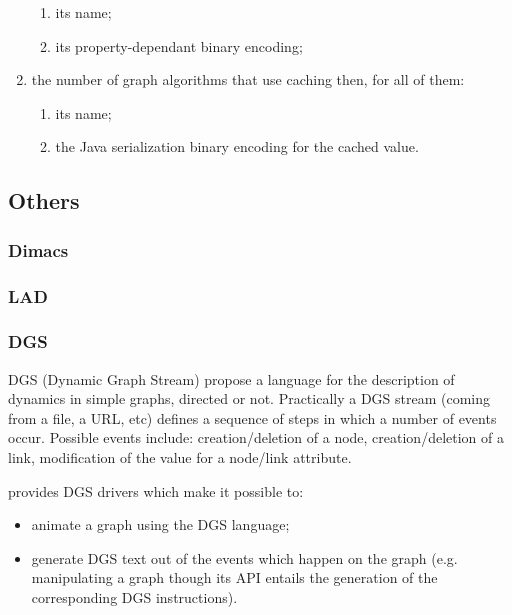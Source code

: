 \documentclass{article}
\begin{document}
\begin{enumerate}
  	  	\begin{enumerate}
	  	\item its name;
	  	\item its property-dependant binary encoding;
		\end{enumerate}
  \item the number of graph algorithms that use caching then, for all of them:
  	  	\begin{enumerate}
	  	\item its name;
	  	\item the Java serialization binary encoding for the cached value.
		\end{enumerate}
\end{enumerate}


\subsection{Others}

\subsubsection{Dimacs}

\subsubsection{LAD}


\subsubsection{DGS}
	
		DGS (Dynamic Graph Stream) propose a  language for the description
		of dynamics in simple graphs, directed or not.
		Practically a DGS stream (coming from a file, a URL, etc) defines
		a sequence of steps in which a number of events occur. Possible
		events include: creation/deletion of a node, creation/deletion of
		a link, modification of the value for a node/link attribute.
		
		\grph provides DGS drivers which
		make it possible to:
		\begin{itemize}
			\item animate a graph using the DGS language;
			\item generate DGS text out of the events which happen
			on the graph (e.g. manipulating a graph though its API entails
			the generation of the corresponding DGS instructions). 
		\end{itemize}
\end{document}
